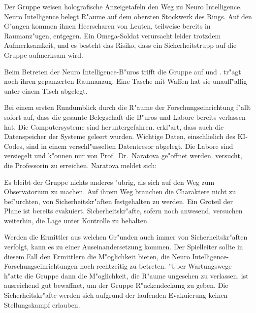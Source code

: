 Der Gruppe weisen holografische Anzeigetafeln den Weg zu Neuro Intelligence. Neuro Intelligence belegt R"aume auf dem obersten Stockwerk des Rings. Auf den G"angen kommen ihnen Heerscharen von Leuten, teilweise bereits in Raumanz"ugen, entgegen. Ein Omega-Soldat verursacht leider trotzdem Aufmerksamkeit, und es besteht das Risiko, dass ein Sicherheitstrupp auf die Gruppe aufmerksam wird.

Beim Betreten der Neuro Intelligence-B"uros trifft die Gruppe auf \xl{} und \ml{}. \xl{} tr"agt noch ihren gepanzerten Raumanzug. Eine Tasche mit Waffen hat sie unauff"allig unter einem Tisch abgelegt.

Bei einem ersten Rundumblick durch die R"aume der Forschungseinrichtung f"allt sofort auf, dass die gesamte Belegschaft die B"uros und Labore bereits verlassen hat. Die Computersysteme sind heruntergefahren. \ml{} erkl"art, dass auch die Datenspeicher der Systeme geleert wurden. Wichtige Daten, einschlie\3lich des KI-Codes, sind in einem verschl"usselten Datentresor abgelegt. Die Labore sind versiegelt und k"onnen nur von Prof.~Dr.~Naratova ge"offnet werden. \ml{} versucht, die Professorin zu erreichen. Naratova meldet sich:


Es bleibt der Gruppe nichts anderes "ubrig, als sich auf den Weg zum Observatorium zu machen. Auf ihrem Weg brauchen die Charaktere nicht zu bef"urchten, von Sicherheitskr"aften festgehalten zu werden. Ein Gro\3teil der Plane ist bereits evakuiert. Sicherheitskr"afte, sofern noch anwesend, versuchen weiterhin, die Lage unter Kontrolle zu behalten.

\begin{remarks}
    Werden die Ermittler aus welchen Gr"unden auch immer von Sicherheitskr"aften verfolgt, kann es zu einer Auseinandersetzung kommen. Der Spielleiter sollte in diesem Fall den Ermittlern die M"oglichkeit bieten, die Neuro Intelligence-Forschungseinrichtungen noch rechtzeitig zu betreten. "Uber Wartungswege h"atte die Gruppe dann die M"oglichkeit, die R"aume ungesehen zu verlassen. \xl{} ist ausreichend gut bewaffnet, um der Gruppe R"uckendeckung zu geben. Die Sicherheitskr"afte werden sich aufgrund der laufenden Evakuierung keinen Stellungskampf erlauben.
\end{remarks}
